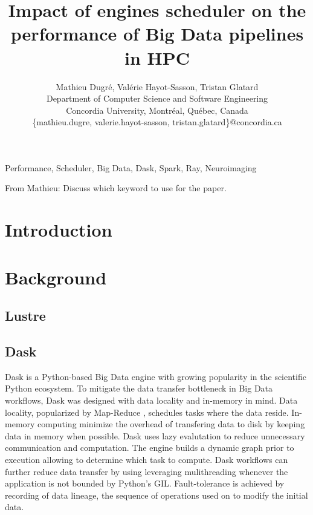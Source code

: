 \documentclass[conference]{IEEEtran}
\newcommand{\MD}[1]{\color{magenta}From Mathieu: #1 \color{black}}
\begin{document}
\title{Impact of engines scheduler on the performance of Big Data pipelines in HPC}

\author{Mathieu Dugr\'e, Val\'erie Hayot-Sasson, Tristan Glatard\\
	Department of Computer Science and Software Engineering\\
	Concordia University, Montr\'eal, Qu\'ebec, Canada\\
	\{mathieu.dugre, valerie.hayot-sasson, tristan.glatard\}@concordia.ca
	\vspace*{0.8cm} %
}

\maketitle

\begin{abstract}
\end{abstract}

\begin{IEEEkeywords}
	Performance, Scheduler, Big Data, Dask, Spark, Ray, Neuroimaging
\end{IEEEkeywords}
\MD{Discuss which keyword to use for the paper.}

\section{Introduction}

\section{Background}
\subsection{Lustre} %

\subsection{Dask}
Dask is a Python-based Big Data engine with growing popularity in the scientific Python ecosystem.
To mitigate the data transfer bottleneck in Big Data workflows, Dask was designed with data locality and in-memory in mind.
Data locality, popularized by Map-Reduce \cite{dean2008mapreduce}, schedules tasks where the data reside.
In-memory computing minimize the overhead of transfering data to disk by keeping data in memory when possible.
Dask uses lazy evalutation to reduce unnecessary communication and computation.
The engine builds a dynamic graph prior to execution allowing to determine which task to compute.
Dask workflows can further reduce data transfer by using  leveraging mulithreading whenever the application is not bounded by Python's GIL.
Fault-tolerance is achieved by recording of data lineage, the sequence of operations used on to modify the initial data.
\end{document}
